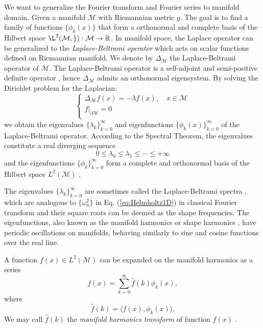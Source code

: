 We want to generalize the Fourier transform and Fourier series to manifold domain.
Given a manifold $\mathcal{M}$ with Riemannian metric $g$. The goal is to find a
family of functions $\{\phi_k(x)\}$ that form a orthonormal and complete basis of the
Hilbert space $\L^2(\mathcal{M,g}):\mathcal{M}\to\mathbb{R}$. In manifold space, the Laplace
operator can be generalized to the \emph{Laplace-Beltrami operator} which acts on scalar functions defined on
Riemannian manifold. We denote by $\Delta_\mathcal{M}$ the Laplace-Beltrami operator
of $\mathcal{M}$. The Laplace-Beltrami operator is a self-adjoint and semi-positive definite
operator \cite{Rosenberg:1997}, hence $\Delta_\mathcal{M}$ admits an orthonormal eigensystem.
By solving the Dirichlet problem for the Laplacian:
\begin{equation}
\left\{
    \begin{array}{l}
        \Delta_\mathcal{M}f(x)=-\lambda f(x),\quad x\in\mathcal{M}\\
        f|_{\partial\mathcal{M}}=0\\
    \end{array}
\right.
\end{equation}
we obtain the eigenvalues $\{\lambda_k\}_{k=0}^\infty$ and eigenfunctions $\{\phi_k(x)\}_{k=0}^\infty$ of the Laplace-Beltrami operator. According to the Spectral Theorem, the eigenvalues constitute a real diverging sequence
\begin{equation*}
0\leq\lambda_0\leq\lambda_1\leq\cdots\leq +\infty
\end{equation*}
and the eigenfunctions $\{\phi_k\}_{k=0}^\infty$ form a complete and orthonormal basis of the Hilbert space $L^2(\mathcal{M})$ \cite{Levy2006}.

The eigenvalues $\{\lambda_k\}_{k=0}^\infty$ are sometimes called the Laplace-Beltrami spectra \cite{Reuter:2006:CAD}, which are analogous to $\{\omega_n^2\}$
in Eq. (\ref{eq:Helmholtz1D}) in classical Fourier transform and their square roots can be deemed as the shape frequencies. The eigenfunctions, also known
 as the manifold harmonics or shape harmonics \cite{Vallet2008}, have periodic oscillations on manifolds, behaving similarly to sine and cosine functions over the real line.

A function $f(x)\in L^2(\mathcal{M})$ can be expanded on the manifold harmonics as a series
\begin{equation}\label{eq:ift}
f(x)=\sum_{k=0}^\infty\hat{f}(k)\phi_k(x),
\end{equation}
where
\begin{equation}
\hat{f}(k)=\langle f(x),\phi_k(x)\rangle.
\end{equation}
We may call $\hat{f}(k)$ the \emph{manifold harmonics transform} of function $f(x)$ \cite{Hou2012}.


